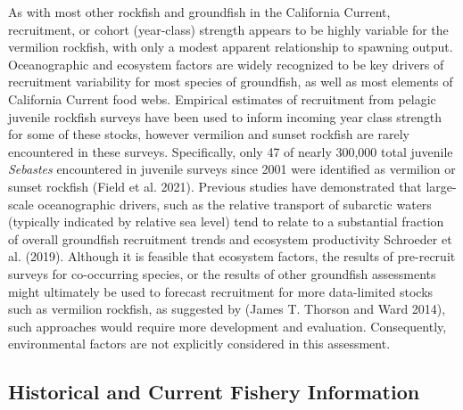 \documentclass[11pt,
  english,
  a4paper,
]{article}
\begin{document}
As with most other rockfish and groundfish in the California Current, recruitment, or cohort (year-class) strength appears to be highly variable for the vermilion rockfish, with only a modest apparent relationship to spawning output. Oceanographic and ecosystem factors are widely recognized to be key drivers of recruitment variability for most species of groundfish, as well as most elements of California Current food webs. Empirical estimates of recruitment from pelagic juvenile rockfish surveys have been used to inform incoming year class strength for some of these stocks, however vermilion and sunset rockfish are rarely encountered in these surveys. Specifically, only 47 of nearly 300,000 total juvenile \emph{Sebastes} encountered in juvenile surveys since 2001 were identified as vermilion or sunset rockfish {(Field et al. 2021)\leavevmode\tagmcend\tagstructend}. Previous studies have demonstrated that large-scale oceanographic drivers, such as the relative transport of subarctic waters (typically indicated by relative sea level) tend to relate to a substantial fraction of overall groundfish recruitment trends and ecosystem productivity {Schroeder et al. (2019)\leavevmode\tagmcend\tagstructend}. Although it is feasible that ecosystem factors, the results of pre-recruit surveys for co-occurring species, or the results of other groundfish assessments might ultimately be used to forecast recruitment for more data-limited stocks such as vermilion rockfish, as suggested by {(James T. Thorson and Ward 2014)\leavevmode\tagmcend\tagstructend}, such approaches would require more development and evaluation. Consequently, environmental factors are not explicitly considered in this assessment.

\leavevmode\tagmcend\tagstructend\par


\hypertarget{historical-and-current-fishery-information}{%
\subsection{Historical and Current Fishery Information}\label{historical-and-current-fishery-information}}

\leavevmode\tagmcend\tagstructend

\end{document}
